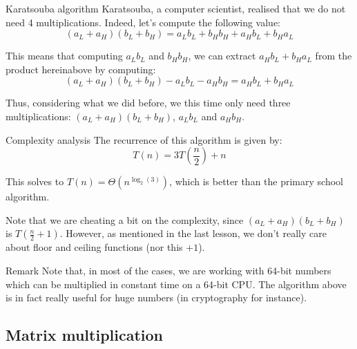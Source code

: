 \documentclass[a4paper]{article}
\begin{document}
\begin{parag}{Karatsouba algorithm}
    Karatsouba, a computer scientist, realised that we do not need 4 multiplications. Indeed, let's compute the following value: 
    \[\left(a_L + a_H\right)\left(b_L + b_H\right) = a_L b_L + b_H b_H + a_H b_L + b_H a_L\]
    
    This means that computing $a_L b_L$ and $b_H b_H$, we can extract $a_H b_L + b_H a_L$ from the product hereinabove by computing:
    \[\left(a_L + a_H\right)\left(b_L + b_H\right) - a_L b_L - a_H b_H = a_H b_L + b_H a_L\]

    Thus, considering what we did before, we this time only need three multiplications: $\left(a_L + a_H\right)\left(b_L + b_H\right)$, $a_L b_L$ and $a_H b_H$. 

    \begin{subparag}{Complexity analysis}
        The recurrence of this algorithm is given by:
        \[T\left(n\right) = 3T\left(\frac{n}{2}\right) + n\]

        This solves to $T\left(n\right) = \Theta\left(n^{\log_2\left(3\right)}\right)$, which is better than the primary school algorithm.

        Note that we are cheating a bit on the complexity, since $\left(a_L + a_H\right)\left(b_L + b_H\right)$ is $T\left(\frac{n}{2} + 1\right)$. However, as mentioned in the last lesson, we don't really care about floor and ceiling functions (nor this $+1$).
    \end{subparag}
\end{parag}

\begin{parag}{Remark}
    Note that, in most of the cases, we are working with 64-bit numbers which can be multiplied in constant time on a 64-bit CPU. The algorithm above is in fact really useful for huge numbers (in cryptography for instance).
\end{parag}


\subsection{Matrix multiplication}
\end{document}
